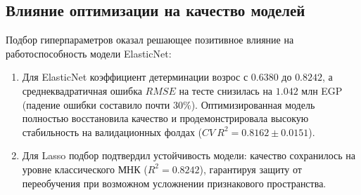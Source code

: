 \subsection{Влияние оптимизации на качество моделей}
Подбор гиперпараметров оказал решающее позитивное влияние на работоспособность модели ElasticNet:
\begin{enumerate}
    \item Для ElasticNet коэффициент детерминации возрос с $0.6380$ до $0.8242$, а среднеквадратичная ошибка $RMSE$ на тесте снизилась на $1.042$ млн EGP (падение ошибки составило почти 30\%). Оптимизированная модель полностью восстановила качество и продемонстрировала высокую стабильность на валидационных фолдах ($CV\ R^2 = 0.8162 \pm 0.0151$).
    \item Для Lasso подбор подтвердил устойчивость модели: качество сохранилось на уровне классического МНК ($R^2 = 0.8242$), гарантируя защиту от переобучения при возможном усложнении признакового пространства.
\end{enumerate}
